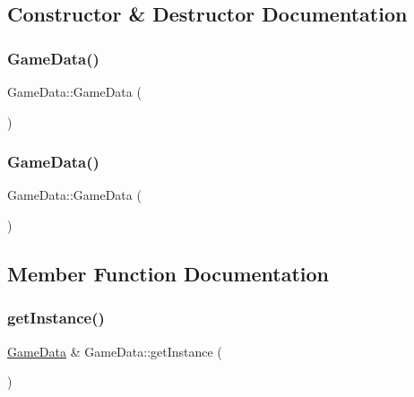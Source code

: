 \subsection{Constructor \& Destructor Documentation}
\mbox{\label{class_game_data_a0361292205caafffd2810013c2fef134}} 
\subsubsection{\texorpdfstring{Game\+Data()}{GameData()}\hspace{0.1cm}{\footnotesize\ttfamily [1/2]}}
{\footnotesize\ttfamily Game\+Data\+::\+Game\+Data (\begin{DoxyParamCaption}\item[{\hyperlink{class_game_data}{Game\+Data} const \&}]{ }\end{DoxyParamCaption})\hspace{0.3cm}{\ttfamily [delete]}}

\mbox{\label{class_game_data_af4225d69d56095e6d1a6d3bdeba8602f}} 
\subsubsection{\texorpdfstring{Game\+Data()}{GameData()}\hspace{0.1cm}{\footnotesize\ttfamily [2/2]}}
{\footnotesize\ttfamily Game\+Data\+::\+Game\+Data (\begin{DoxyParamCaption}\item[{\hyperlink{class_game_data}{Game\+Data} \&\&}]{ }\end{DoxyParamCaption})\hspace{0.3cm}{\ttfamily [delete]}}



\subsection{Member Function Documentation}
\mbox{\label{class_game_data_a5930d5371cde0a43f4fa05b6b7152bb8}} 
\subsubsection{\texorpdfstring{get\+Instance()}{getInstance()}}
{\footnotesize\ttfamily \hyperlink{class_game_data}{Game\+Data} \& Game\+Data\+::get\+Instance (\begin{DoxyParamCaption}{ }\end{DoxyParamCaption})\hspace{0.3cm}{\ttfamily [static]}}

